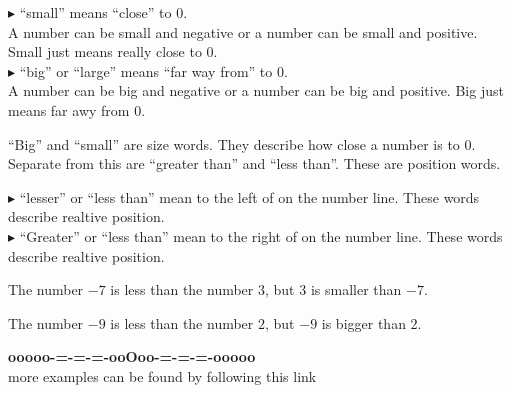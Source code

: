 \documentclass{ximera}
\begin{document}
\begin{idea}

\textbf{\textcolor{blue!55!black}{$\blacktriangleright$}}  ``small'' means ``close'' to $0$. \\


A number can be small and negative or a number can be small and positive. Small just means really close to $0$. \\


\textbf{\textcolor{blue!55!black}{$\blacktriangleright$}}  ``big'' or ``large'' means ``far way from'' to $0$. \\


A number can be big and negative or a number can be big and positive. Big just means far awy from $0$. \\


\end{idea}


``Big'' and ``small'' are size words.  They describe how close a number is to $0$. \\

Separate from this are ``greater than'' and ``less than''.  These are position words. \\

\begin{idea}


\textbf{\textcolor{blue!55!black}{$\blacktriangleright$}} ``lesser'' or ``less than'' mean to the left of on the number line. These words describe realtive position.\\


\textbf{\textcolor{blue!55!black}{$\blacktriangleright$}} ``Greater'' or ``less than'' mean to the right of on the number line. These words describe realtive position.\\



\begin{example}


The number $-7$ is less than the number $3$, but $3$ is smaller than $-7$.



\end{example}



\begin{example}


The number $-9$ is less than the number $2$, but $-9$ is bigger than $2$.



\end{example}


\end{idea}

















\begin{center}
\textbf{\textcolor{green!50!black}{ooooo-=-=-=-ooOoo-=-=-=-ooooo}} \\

more examples can be found by following this link\\ 

\end{center}
\end{document}
